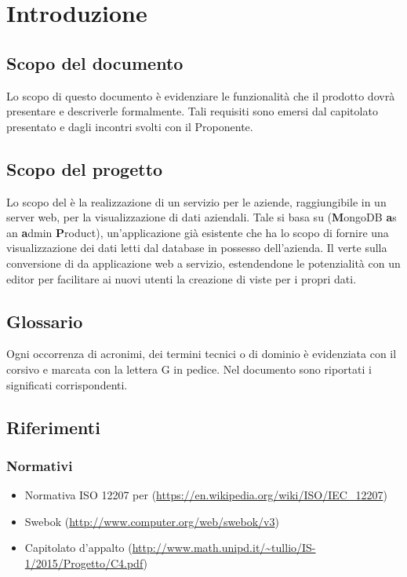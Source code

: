 \section{Introduzione}
\subsection{Scopo del documento}
Lo scopo di questo documento è evidenziare le funzionalit\`a che il prodotto dovr\`a presentare e descriverle formalmente. Tali requisiti sono emersi dal capitolato presentato e dagli incontri svolti con il Proponente.

\subsection{Scopo del progetto}
Lo scopo del  è la realizzazione di un servizio per le aziende, raggiungibile in un server web, per la visualizzazione di dati aziendali. Tale  si basa su  (\textbf{M}ongoDB \textbf{a}s an \textbf{a}dmin \textbf{P}roduct), un'applicazione già esistente che ha lo scopo di fornire una visualizzazione dei dati letti dal database  in possesso dell'azienda. Il  verte sulla conversione di  da applicazione web a servizio, estendendone le potenzialità con un editor per facilitare ai nuovi utenti la creazione di viste per i propri dati.

\subsection{Glossario} 
Ogni occorrenza di acronimi, dei termini tecnici o di dominio è evidenziata con il corsivo e marcata con la lettera G in pedice. Nel documento \Glossario sono riportati i significati corrispondenti.

\subsection{Riferimenti}
\subsubsection{Normativi}
\begin{itemize}
\item Normativa ISO 12207 per  (\url{https://en.wikipedia.org/wiki/ISO/IEC_12207})
\item Swebok (\url{http://www.computer.org/web/swebok/v3})
\item Capitolato d'appalto (\url{http://www.math.unipd.it/~tullio/IS-1/2015/Progetto/C4.pdf})
\end{itemize}

